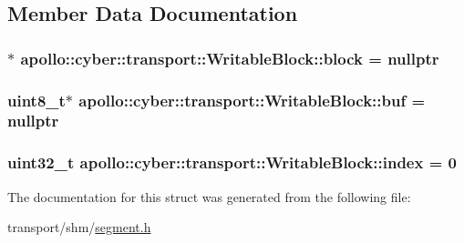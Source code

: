 \subsection{Member Data Documentation}
\hypertarget{structapollo_1_1cyber_1_1transport_1_1WritableBlock_af10f17500693ff4dffedbb56f8b26119}{
\subsubsection[{block}]{$\ast$ apollo\-::cyber\-::transport\-::\-Writable\-Block\-::block = nullptr}}\label{structapollo_1_1cyber_1_1transport_1_1WritableBlock_af10f17500693ff4dffedbb56f8b26119}
\hypertarget{structapollo_1_1cyber_1_1transport_1_1WritableBlock_a2e82d782aa6e76c40a0ee083dae061f5}{
\subsubsection[{buf}]{\setlength{\rightskip}{0pt plus 5cm}uint8\-\_\-t$\ast$ apollo\-::cyber\-::transport\-::\-Writable\-Block\-::buf = nullptr}}\label{structapollo_1_1cyber_1_1transport_1_1WritableBlock_a2e82d782aa6e76c40a0ee083dae061f5}
\hypertarget{structapollo_1_1cyber_1_1transport_1_1WritableBlock_adcffe4e278eab8879135e0def760e60b}{
\subsubsection[{index}]{\setlength{\rightskip}{0pt plus 5cm}uint32\-\_\-t apollo\-::cyber\-::transport\-::\-Writable\-Block\-::index = 0}}\label{structapollo_1_1cyber_1_1transport_1_1WritableBlock_adcffe4e278eab8879135e0def760e60b}


The documentation for this struct was generated from the following file\-:\begin{DoxyCompactItemize}
\item 
transport/shm/\hyperlink{segment_8h}{segment.\-h}\end{DoxyCompactItemize}
